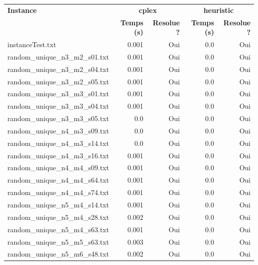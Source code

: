 \documentclass{article}
\begin{document}
\begin{center}
\renewcommand{\arraystretch}{1.3}
\begin{tabular}{lrrrr}
\hline
\textbf{Instance} & \multicolumn{2}{c}{\textbf{cplex}} & \multicolumn{2}{c}{\textbf{heuristic}}\\
 & \textbf{Temps (s)} & \textbf{Resolue ?} & \textbf{Temps (s)} & \textbf{Resolue ?}\\ \hline
instanceTest.txt & 0.001 & Oui & 0.0 & Oui\\
random\_unique\_n3\_m2\_s01.txt & 0.001 & Oui & 0.0 & Oui\\
random\_unique\_n3\_m2\_s04.txt & 0.001 & Oui & 0.0 & Oui\\
random\_unique\_n3\_m2\_s05.txt & 0.001 & Oui & 0.0 & Oui\\
random\_unique\_n3\_m3\_s01.txt & 0.001 & Oui & 0.0 & Oui\\
random\_unique\_n3\_m3\_s04.txt & 0.001 & Oui & 0.0 & Oui\\
random\_unique\_n3\_m3\_s05.txt & 0.0 & Oui & 0.0 & Oui\\
random\_unique\_n4\_m3\_s09.txt & 0.0 & Oui & 0.0 & Oui\\
random\_unique\_n4\_m3\_s14.txt & 0.0 & Oui & 0.0 & Oui\\
random\_unique\_n4\_m3\_s16.txt & 0.001 & Oui & 0.0 & Oui\\
random\_unique\_n4\_m4\_s09.txt & 0.001 & Oui & 0.0 & Oui\\
random\_unique\_n4\_m4\_s64.txt & 0.001 & Oui & 0.0 & Oui\\
random\_unique\_n4\_m4\_s74.txt & 0.001 & Oui & 0.0 & Oui\\
random\_unique\_n5\_m4\_s14.txt & 0.001 & Oui & 0.0 & Oui\\
random\_unique\_n5\_m4\_s28.txt & 0.002 & Oui & 0.0 & Oui\\
random\_unique\_n5\_m4\_s63.txt & 0.001 & Oui & 0.0 & Oui\\
random\_unique\_n5\_m5\_s63.txt & 0.003 & Oui & 0.0 & Oui\\
random\_unique\_n5\_m6\_s48.txt & 0.002 & Oui & 0.0 & Oui\\
\hline
\end{tabular}
\end{center}
\end{document}
